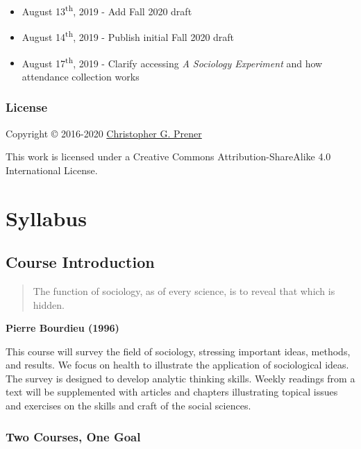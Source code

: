 \documentclass[
]{book}
\providecommand{\tightlist}{%
  \setlength{\itemsep}{0pt}\setlength{\parskip}{0pt}}
\begin{document}
\begin{itemize}
\tightlist
\item
  August 13\textsuperscript{th}, 2019 - Add Fall 2020 draft
\item
  August 14\textsuperscript{th}, 2019 - Publish initial Fall 2020 draft
\item
  August 17\textsuperscript{th}, 2019 - Clarify accessing \emph{A Sociology Experiment} and how attendance collection works
\end{itemize}

\hypertarget{license}{%
\section*{License}\label{license}}

Copyright © 2016-2020 \href{https://chris-prener.github.io}{Christopher G. Prener}

This work is licensed under a Creative Commons Attribution-ShareAlike 4.0 International License.

\hypertarget{part-syllabus}{%
\part{Syllabus}\label{part-syllabus}}

\hypertarget{course-introduction}{%
\chapter{Course Introduction}\label{course-introduction}}

\begin{quote}
The function of sociology, as of every science, is to reveal that which is hidden.
\end{quote}

\textbf{Pierre Bourdieu (1996)}

This course will survey the field of sociology, stressing important ideas, methods, and results. We focus on health to illustrate the application of sociological ideas. The survey is designed to develop analytic thinking skills. Weekly readings from a text will be supplemented with articles and chapters illustrating topical issues and exercises on the skills and craft of the social sciences.

\hypertarget{two-courses-one-goal}{%
\section{Two Courses, One Goal}\label{two-courses-one-goal}}
\end{document}
